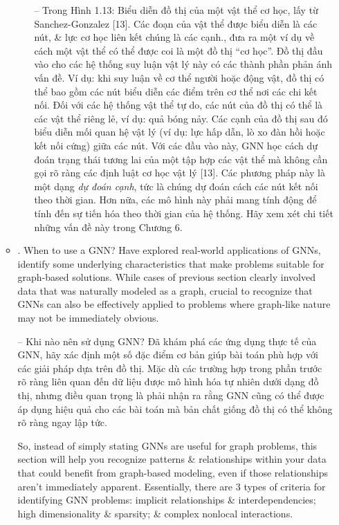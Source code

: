 \documentclass{article}
\begin{document}
\begin{itemize}
\begin{itemize}
\begin{itemize}
            -- Trong {\sf Hình 1.13: Biểu diễn đồ thị của một vật thể cơ học, lấy từ Sanchez-Gonzalez [13]. Các đoạn của vật thể được biểu diễn là các nút, \& lực cơ học liên kết chúng là các cạnh.}, đưa ra một ví dụ về cách một vật thể có thể được coi là một đồ thị ``cơ học''. Đồ thị đầu vào cho các hệ thống suy luận vật lý này có các thành phần phản ánh vấn đề. Ví dụ: khi suy luận về cơ thể người hoặc động vật, đồ thị có thể bao gồm các nút biểu diễn các điểm trên cơ thể nơi các chi kết nối. Đối với các hệ thống vật thể tự do, các nút của đồ thị có thể là các vật thể riêng lẻ, ví dụ: quả bóng nảy. Các cạnh của đồ thị sau đó biểu diễn mối quan hệ vật lý (ví dụ: lực hấp dẫn, lò xo đàn hồi hoặc kết nối cứng) giữa các nút. Với các đầu vào này, GNN học cách dự đoán trạng thái tương lai của một tập hợp các vật thể mà không cần gọi rõ ràng các định luật cơ học vật lý [13]. Các phương pháp này là một dạng {\it dự đoán cạnh}, tức là chúng dự đoán cách các nút kết nối theo thời gian. Hơn nữa, các mô hình này phải mang tính động để tính đến sự tiến hóa theo thời gian của hệ thống. Hãy xem xét chi tiết những vấn đề này trong Chương 6.
        \end{itemize}
        \item {. When to use a GNN?} Have explored real-world applications of GNNs, identify some underlying characteristics that make problems suitable for graph-based solutions. While cases of previous section clearly involved data that was naturally modeled as a graph, crucial to recognize that GNNs can also be effectively applied to problems where graph-like nature may not be immediately obvious.

        -- {\sf Khi nào nên sử dụng GNN?} Đã khám phá các ứng dụng thực tế của GNN, hãy xác định một số đặc điểm cơ bản giúp bài toán phù hợp với các giải pháp dựa trên đồ thị. Mặc dù các trường hợp trong phần trước rõ ràng liên quan đến dữ liệu được mô hình hóa tự nhiên dưới dạng đồ thị, nhưng điều quan trọng là phải nhận ra rằng GNN cũng có thể được áp dụng hiệu quả cho các bài toán mà bản chất giống đồ thị có thể không rõ ràng ngay lập tức.

        So, instead of simply stating GNNs are useful for graph problems, this section will help you recognize patterns \& relationships within your data that could benefit from graph-based modeling, even if those relationships aren't immediately apparent. Essentially, there are 3 types of criteria for identifying GNN problems: implicit relationships \& interdependencies; high dimensionality \& sparsity; \& complex nonlocal interactions.


\end{itemize}
\end{itemize}
\end{document}
